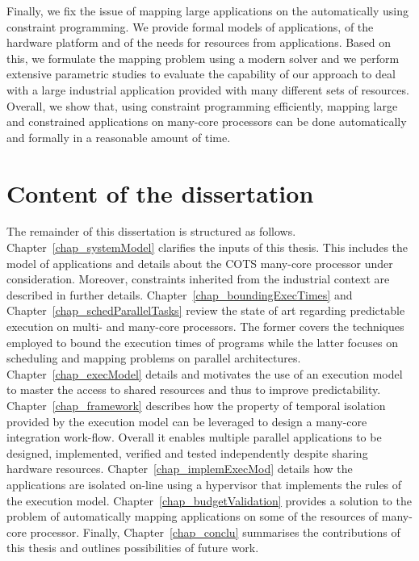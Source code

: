\documentclass[main.tex]{subfiles}
\begin{document}
Finally, we fix the issue of mapping large applications on the \mppalong automatically using constraint programming. We provide formal models of applications, of the hardware platform and of the needs for resources from applications. Based on this, we formulate the mapping problem using a modern solver and we perform extensive parametric studies to evaluate the capability of our approach to deal with a large industrial application provided with many different sets of resources. Overall, we show that, using constraint programming efficiently, mapping large and constrained applications on many-core processors can be done automatically and formally in a reasonable amount of time.


\section{Content of the dissertation}
The remainder of this dissertation is structured as follows. 
Chapter~\ref{chap_systemModel} clarifies the inputs of this thesis. This includes the model of applications and details about the COTS many-core processor under consideration. Moreover, constraints inherited from the industrial context are described in further details.
Chapter~\ref{chap_boundingExecTimes} and Chapter~\ref{chap_schedParallelTasks} review the state of art regarding predictable execution on multi- and many-core processors. The former covers the techniques employed to bound the execution times of programs while the latter focuses on scheduling and mapping problems on parallel architectures.
Chapter~\ref{chap_execModel} details and motivates the use of an execution model to master the access to shared resources and thus to improve predictability. Chapter~\ref{chap_framework} describes how the property of temporal isolation provided by the execution model can be leveraged to design a many-core integration work-flow. Overall it enables multiple parallel applications to be designed, implemented, verified and tested independently despite sharing hardware resources. 
Chapter~\ref{chap_implemExecMod} details how the applications are isolated on-line using a hypervisor that implements the rules of the execution model. Chapter~\ref{chap_budgetValidation} provides a solution to the problem of automatically mapping applications on some of the resources of many-core processor.
Finally, Chapter~\ref{chap_conclu} summarises the contributions of this thesis and outlines possibilities of future work.





\clearpage
\subbiblio
\end{document}
